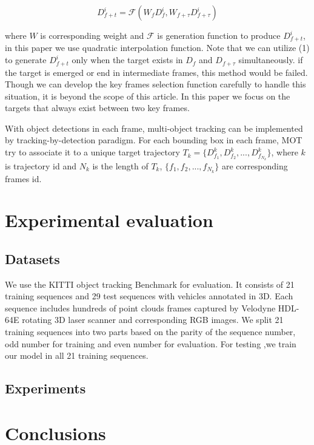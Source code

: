 \documentclass{bmvc2k}
\begin{document}
\begin{equation}
D^i_{f+t} = \mathcal{F}(W_f D^i_f, W_{f+\tau} D^i_{f+\tau})
\end{equation}

where $W$ is corresponding weight and $\mathcal{F}$ is generation function to produce $D^i_{f+t}$, in this paper we use quadratic interpolation function. Note that we can utilize (1) to generate $D^i_{f+t}$ only when the target exists in $D_f$ and $D_{f+\tau}$ simultaneously. if the target is emerged or end in intermediate frames, this method would be failed. Though we can develop the key frames selection function carefully to handle this situation, it is beyond the scope of this article. In this paper we focus on the targets that always exist between two key frames.

With object detections in each frame, multi-object tracking can be implemented by tracking-by-detection paradigm. For each bounding box in each frame, MOT try to associate it to a unique target trajectory $T_k = \{D^k_{f_1}, D^k_{f_2}, ..., D^k_{f_{N_k}}\}$, where $k$ is trajectory id and $N_k$ is the length of $T_k$, $\{f_1, f_2, ..., f_{N_k}\}$ are corresponding frames id.

\section{Experimental evaluation}
\label{sec:experiments}

\subsection{Datasets}
We use the KITTI object tracking Benchmark \cite{geiger2013vision} for evaluation. It consists of 21 training sequences and 29 test sequences with vehicles annotated in 3D. Each sequence includes hundreds of point clouds frames captured by Velodyne HDL-64E rotating 3D laser scanner and corresponding RGB images. We split 21 training sequences into two parts based on the parity of the sequence number, odd number for training and even number for evaluation. For testing ,we train our model in all 21 training sequences.

\subsection{Experiments}


\section{Conclusions}
\label{sec:conclusions}



\end{document}

